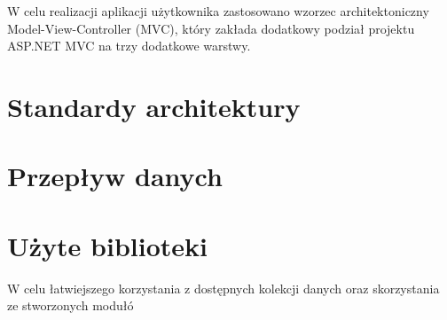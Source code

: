 W celu realizacji aplikacji użytkownika zastosowano wzorzec architektoniczny Model-View-Controller (MVC), który zakłada dodatkowy podział projektu ASP.NET MVC na trzy dodatkowe warstwy. 



\section{Standardy architektury}

\section{Przepływ danych}

\section{Użyte biblioteki}

W celu łatwiejszego korzystania z dostępnych kolekcji danych oraz skorzystania ze stworzonych modułó

